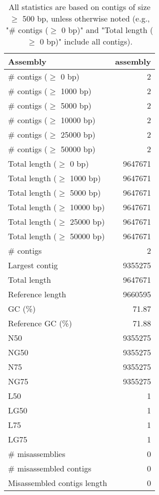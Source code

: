 \documentclass[12pt,a4paper]{article}
\begin{document}
\begin{table}[ht]
\begin{center}
\caption{All statistics are based on contigs of size $\geq$ 500 bp, unless otherwise noted (e.g., "\# contigs ($\geq$ 0 bp)" and "Total length ($\geq$ 0 bp)" include all contigs).}
\begin{tabular}{|l*{1}{|r}|}
\hline
Assembly & assembly \\ \hline
\# contigs ($\geq$ 0 bp) & 2 \\ \hline
\# contigs ($\geq$ 1000 bp) & 2 \\ \hline
\# contigs ($\geq$ 5000 bp) & 2 \\ \hline
\# contigs ($\geq$ 10000 bp) & 2 \\ \hline
\# contigs ($\geq$ 25000 bp) & 2 \\ \hline
\# contigs ($\geq$ 50000 bp) & 2 \\ \hline
Total length ($\geq$ 0 bp) & 9647671 \\ \hline
Total length ($\geq$ 1000 bp) & 9647671 \\ \hline
Total length ($\geq$ 5000 bp) & 9647671 \\ \hline
Total length ($\geq$ 10000 bp) & 9647671 \\ \hline
Total length ($\geq$ 25000 bp) & 9647671 \\ \hline
Total length ($\geq$ 50000 bp) & 9647671 \\ \hline
\# contigs & 2 \\ \hline
Largest contig & 9355275 \\ \hline
Total length & 9647671 \\ \hline
Reference length & 9660595 \\ \hline
GC (\%) & 71.87 \\ \hline
Reference GC (\%) & 71.88 \\ \hline
N50 & 9355275 \\ \hline
NG50 & 9355275 \\ \hline
N75 & 9355275 \\ \hline
NG75 & 9355275 \\ \hline
L50 & 1 \\ \hline
LG50 & 1 \\ \hline
L75 & 1 \\ \hline
LG75 & 1 \\ \hline
\# misassemblies & 0 \\ \hline
\# misassembled contigs & 0 \\ \hline
Misassembled contigs length & 0 \\ \hline

\end{tabular}
\end{center}
\end{table}
\end{document}
